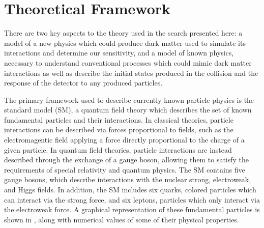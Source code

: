 \chapter{Theoretical Framework}
\label{theory}
There are two key aspects to the theory used in the search presented here: a model of a new physics which could produce dark matter used to simulate its interactions and determine our sensitivity, and a model of known physics, necessary to understand conventional processes which could mimic dark matter interactions as well as describe the initial states produced in the collision and the response of the detector to any produced particles.

The primary framework used to describe currently known particle physics is the standard model (SM), a quantum field theory which describes the set of known fundamental particles and their interactions.
In classical theories, particle interactions can be described via forces proportional to fields, such as the electromagentic field applying a force directly proportional to the charge of a given particle.
In quantum field theories, particle interactions are instead described through the exchange of a gauge boson, allowing them to satisfy the requirements of special relativity and quantum physics. 
The SM contains five gauge bosons, which describe interactions with the nuclear strong, electroweak, and Higgs fields.
In addition, the SM includes six quarks, colored particles which can interact via the strong force, and six leptons, particles which only interact via the electroweak force.
A graphical representation of these fundamental particles is shown in , along with numerical values of some of their physical properties.

